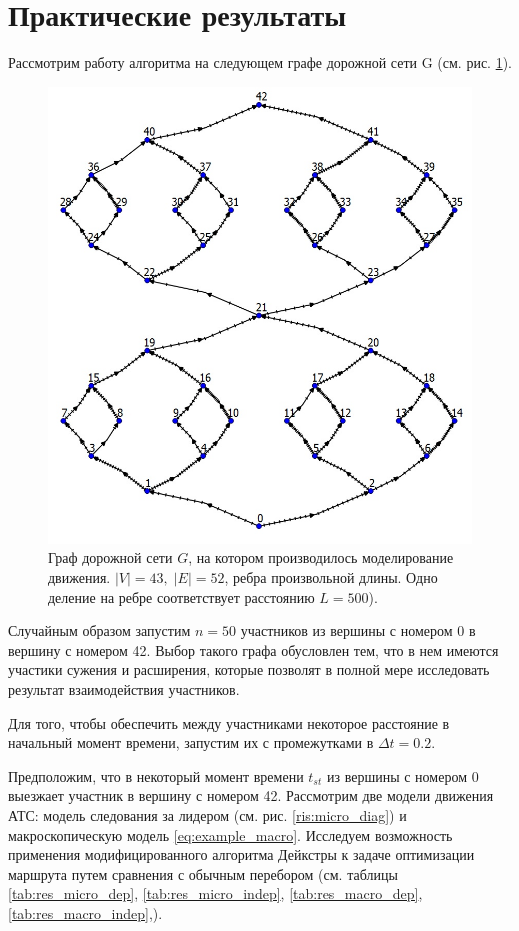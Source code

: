 \documentclass[12pt, a4paper]{article}
\begin{document}
\newpage
\section{Практические результаты}

Рассмотрим работу алгоритма на следующем графе дорожной сети G (см. рис. \ref{ris:graph_example}).
\begin{figure}[H]
	\centering
	\includegraphics[scale=0.2]{graph_example.jpg}
	\caption{Граф дорожной сети $G$, на котором производилось моделирование движения. $|V| = 43, \; |E| = 52$, ребра произвольной длины. Одно деление на ребре соответствует расстоянию $L = 500$).}
	\label{ris:graph_example}
\end{figure}

Случайным образом запустим $n = 50$ участников из вершины с номером 0 в вершину с номером 42.
Выбор такого графа обусловлен тем, что в нем имеются участики сужения и расширения, которые позволят в полной мере исследовать результат взаимодействия участников.

Для того, чтобы обеспечить между участниками некоторое расстояние в начальный момент времени, запустим их с промежутками в $\Delta t = 0.2$.

Предположим, что в некоторый момент времени $t_{st}$ из вершины с номером 0 выезжает участник в вершину с номером 42. Рассмотрим две модели движения АТС: модель следования за лидером (см. рис. \ref{ris:micro_diag}) и макроскопическую модель \eqref{eq:example_macro}. Исследуем возможность применения модифицированного алгоритма Дейкстры к задаче оптимизации маршрута путем сравнения с обычным перебором (см. таблицы \ref{tab:res_micro_dep}, \ref{tab:res_micro_indep}, \ref{tab:res_macro_dep}, \ref{tab:res_macro_indep},). 
\end{document}
